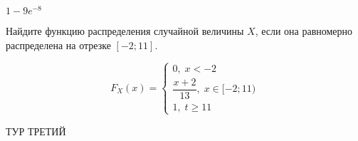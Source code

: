 \documentclass[12pt, addpoints, answers]{exam} %
\begin{document}
\begin{questions}
\begin{solution}
 $1 - 9e^{-8}$
\end{solution}

\question Найдите функцию распределения случайной величины $X$, если она равномерно распределена на отрезке $[-2;11]$.

\begin{solution}
\[
F_X(x)=\begin{cases}
0, \; x< -2 \\
\dfrac{x+2}{13}, \; x \in [-2;11) \\
1, \; t \geq 11
\end{cases}
\]
\end{solution}

\end{questions}

\newpage

\vspace{0.2in}



\begin{center}
ТУР ТРЕТИЙ
\end{center}
\end{document}
